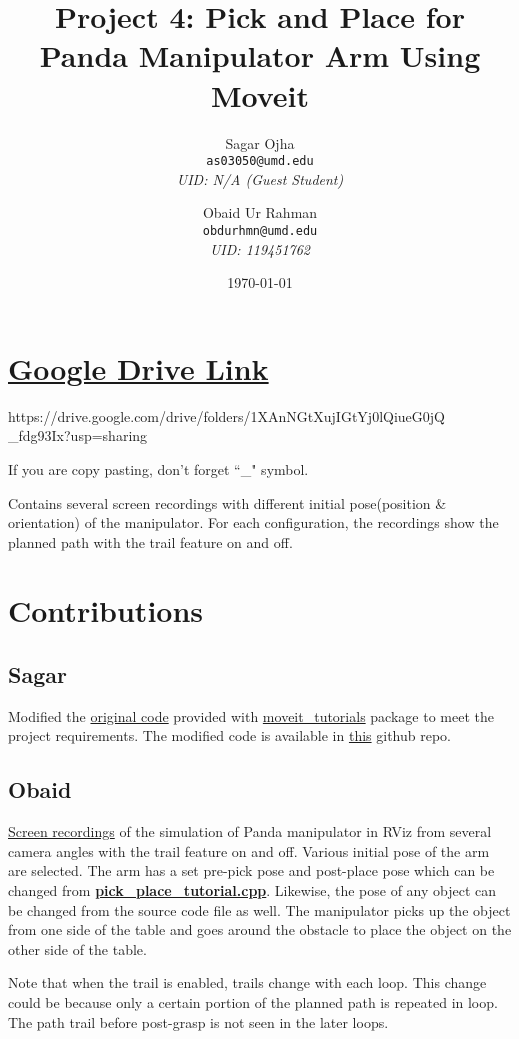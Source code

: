\documentclass[12pt]{extarticle}
\title{Project 4: Pick and Place for Panda Manipulator Arm Using Moveit}
\author{
	Sagar Ojha \\
	\texttt{as03050@umd.edu}\\
	\textit{UID: N/A (Guest Student)}
	\and
	Obaid Ur Rahman\\
	\texttt{obdurhmn@umd.edu}\\
	\textit{UID: 119451762}}
\date{\today}
\begin{document}
\maketitle
\newpage
\section{\href{https://drive.google.com/drive/folders/1XAnNGtXujIGtYj0lQiueG0jQ_fdg93Ix?usp=sharing}{Google Drive Link}}
\hspace{\parindent} https://drive.google.com/drive/folders/1XAnNGtXujIGtYj0lQiueG0jQ
\_fdg93Ix?usp=sharing

If you are copy pasting, don't forget ``\_" symbol.

Contains several screen recordings with different initial pose(position \& orientation) of the manipulator. For each configuration, the recordings show the planned path with the trail feature on and off.

\section{Contributions}
\subsection{Sagar}
\hspace{\parindent} Modified the \href{https://github.com/ros-planning/moveit_tutorials/blob/master/doc/pick_place/src/pick_place_tutorial.cpp}{original code} provided with \href{https://ros-planning.github.io/moveit_tutorials/doc/getting_started/getting_started.html}{moveit\_tutorials} package to meet the project requirements. The modified code is available in \href{https://github.com/Sagar-Ojha/ENPM-661/tree/main/Project4}{this} github repo.

\subsection{Obaid}
\hspace{\parindent} \href{https://drive.google.com/drive/folders/1XAnNGtXujIGtYj0lQiueG0jQ_fdg93Ix?usp=sharing}{Screen recordings} of the simulation of Panda manipulator in RViz from several camera angles with the trail feature on and off. Various initial pose of the arm are selected. The arm has a set pre-pick pose and post-place pose which can be changed from \href{https://github.com/Sagar-Ojha/ENPM-661/tree/main/Project4}{\textbf{pick\_place\_tutorial.cpp}}. Likewise, the pose of any object can be changed from the source code file as well. The manipulator picks up the object from one side of the table and goes around the obstacle to place the object on the other side of the table.

Note that when the trail is enabled, trails change with each loop. This change could be because only a certain portion of the planned path is repeated in loop. The path trail before post-grasp is not seen in the later loops.
\end{document}

